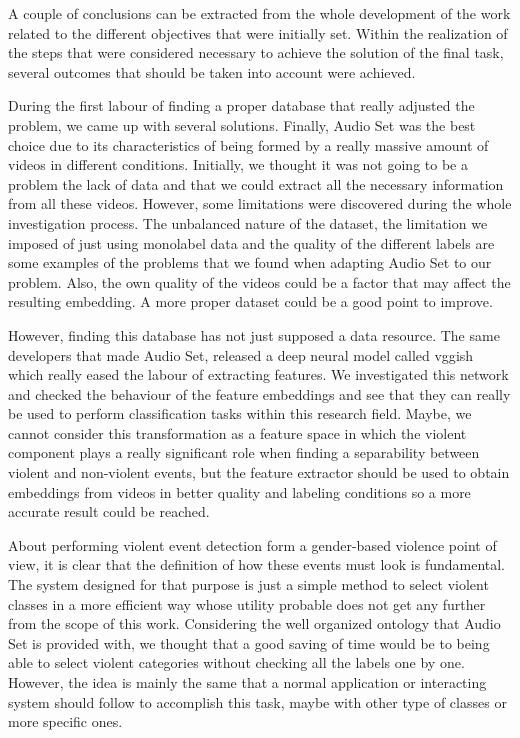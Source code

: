 
	A couple of conclusions can be extracted from the whole development of the work related to the different objectives that were initially set. Within the realization of the steps that were considered necessary to achieve the solution of the final task, several outcomes that should be taken into account were achieved.
	
	During the first labour of finding a proper database that really adjusted the problem, we came up with several solutions. Finally, Audio Set was the best choice due to its characteristics of being formed by a really massive amount of videos in different conditions. Initially, we thought it was not going to be a problem the lack of data and that we could extract all the necessary information from all these videos. However, some limitations were discovered during the whole investigation process. The unbalanced nature of the dataset, the limitation we imposed of just using monolabel data and the quality of the different labels are some examples of the problems that we found when adapting Audio Set to our problem. Also, the own quality of the videos could be a factor that may affect the resulting embedding. A more proper dataset could be a good point to improve.
	
	However, finding this database has not just supposed a data resource. The same developers that made Audio Set, released a deep neural model called \acrshort{vgg}ish which really eased the labour of extracting features. We investigated this network and checked the behaviour of the feature embeddings and see that they can really be used to perform classification tasks within this research field. Maybe, we cannot consider this transformation as a feature space in which the violent component plays a really significant role when finding a separability between violent and non-violent events, but the feature extractor should be used to obtain embeddings from videos in better quality and labeling conditions so a more accurate result could be reached.
	
	About performing violent event detection form a gender-based violence point of view, it is clear that the definition of how these events must look is fundamental. The system designed for that purpose is just a simple method to select violent classes in a more efficient way whose utility probable does not get any further from the scope of this work. Considering the well organized ontology that Audio Set is provided with, we thought that a good saving of time would be to being able to select violent categories without checking all the labels one by one. However, the idea is mainly the same that a normal application or interacting system should follow to accomplish this task, maybe with other type of classes or more specific ones.
	
